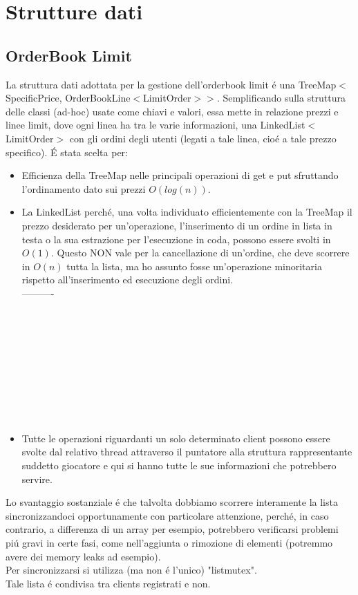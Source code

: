 \chapter{Strutture dati}

\section{OrderBook Limit}
La struttura dati adottata per la gestione dell'orderbook limit \'e una TreeMap\(<\)SpecificPrice, OrderBookLine\(<\)LimitOrder\(>>\). Semplificando sulla struttura delle classi (ad-hoc) usate come chiavi e valori, essa mette in relazione prezzi e linee limit, dove ogni linea ha tra le varie informazioni, una LinkedList\(<\)LimitOrder\(>\) con gli ordini degli utenti (legati a tale linea, cio\'e a tale prezzo specifico). \'E stata scelta per:

\begin{itemize}
\item Efficienza della TreeMap nelle principali operazioni di get e put sfruttando l'ordinamento dato sui prezzi \(O(log(n))\).
\item La LinkedList perch\'e, una volta individuato efficientemente con la TreeMap il prezzo desiderato per un'operazione, l'inserimento di un ordine in lista in testa o la sua estrazione per l'esecuzione in coda, possono essere svolti in \(O(1)\). Questo NON vale per la cancellazione di un'ordine, che deve scorrere in \(O(n)\) tutta la lista, ma ho assunto fosse un'operazione minoritaria rispetto all'inserimento ed esecuzione degli ordini.\\----------\\\\\\\\\\\\\\\\\\\\
\item Tutte le operazioni riguardanti un solo determinato client possono essere svolte dal relativo thread attraverso il puntatore alla struttura rappresentante suddetto giocatore e qui si hanno tutte le sue informazioni che potrebbero servire.
\end{itemize}
\leavevmode
Lo svantaggio sostanziale \'e che talvolta dobbiamo scorrere interamente la lista sincronizzandoci opportunamente con particolare attenzione, perch\'e, in caso contrario, a differenza di un array per esempio, potrebbero verificarsi problemi pi\'u gravi in certe fasi, come nell'aggiunta o rimozione di elementi (potremmo avere dei memory leaks ad esempio). 
\\
Per sincronizzarsi si utilizza (ma non \'e l'unico) "listmutex".
\\
Tale lista \'e condivisa tra clients registrati e non.
 \\
 
